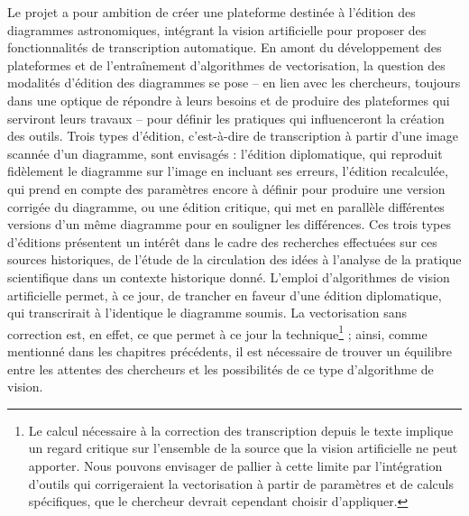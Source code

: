     Le projet \eida a pour ambition de créer une plateforme destinée à l'édition des diagrammes astronomiques, intégrant la vision artificielle pour proposer des fonctionnalités de transcription automatique. En amont du développement des plateformes et de l'entraînement d'algorithmes de vectorisation, la question des modalités d'édition des diagrammes se pose -- en lien avec les chercheurs, toujours dans une optique de répondre à leurs besoins et de produire des plateformes qui serviront leurs travaux -- pour définir les pratiques qui influenceront la création des outils. Trois types d'édition, c'est-à-dire de transcription à partir d'une image scannée d'un diagramme, sont envisagés : l'édition diplomatique, qui reproduit fidèlement le diagramme sur l'image en incluant ses erreurs, l'édition recalculée, qui prend en compte des paramètres encore à définir pour produire une version corrigée du diagramme, ou une édition critique, qui met en parallèle différentes versions d'un même diagramme pour en souligner les différences. Ces trois types d'éditions présentent un intérêt dans le cadre des recherches effectuées sur ces sources historiques, de l'étude de la circulation des idées à l'analyse de la pratique scientifique dans un contexte historique donné. L'emploi d'algorithmes de vision artificielle permet, à ce jour, de trancher en faveur d'une édition diplomatique, qui transcrirait à l'identique le diagramme soumis. La vectorisation sans correction est, en effet, ce que permet à ce jour la technique\footnote{Le calcul nécessaire à la correction des transcription depuis le texte implique un regard critique sur l'ensemble de la source que la vision artificielle ne peut apporter. Nous pouvons envisager de pallier à cette limite par l'intégration d'outils qui corrigeraient la vectorisation à partir de paramètres et de calculs spécifiques, que le chercheur devrait cependant choisir d'appliquer.} ; ainsi, comme mentionné dans les chapitres précédents, il est nécessaire de trouver un équilibre entre les attentes des chercheurs et les possibilités de ce type d'algorithme de vision.
